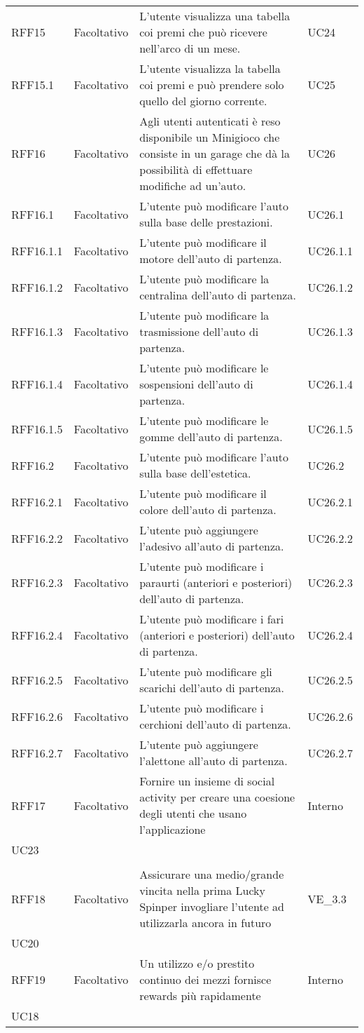 \begin{longtable}{ >{\centering}p{} >{\centering}p{}
		>{\raggedright}p{} >{\centering}p{}}
	\tabularnewline
	RFF15 & Facoltativo & L'utente visualizza una tabella coi premi che può ricevere nell'arco di un mese. & UC24 \tabularnewline
	RFF15.1 & Facoltativo & L'utente visualizza la tabella coi premi e può prendere solo quello del giorno corrente. & UC25
	\tabularnewline
	RFF16 & Facoltativo & Agli utenti autenticati è reso disponibile un Minigioco che consiste in un garage che dà la possibilità di effettuare modifiche ad un'auto. & UC26 
	\tabularnewline
	RFF16.1 & Facoltativo & L'utente può modificare l'auto sulla base delle prestazioni. & UC26.1
	\tabularnewline
	RFF16.1.1 & Facoltativo & L'utente può modificare il motore dell'auto di partenza. & UC26.1.1
	\tabularnewline
	RFF16.1.2 & Facoltativo & L'utente può modificare la centralina dell'auto di partenza. & UC26.1.2
	\tabularnewline
	RFF16.1.3 & Facoltativo & L'utente può modificare la trasmissione dell'auto di partenza. & UC26.1.3
	\tabularnewline
	RFF16.1.4 & Facoltativo & L'utente può modificare le sospensioni dell'auto di partenza. & UC26.1.4
	\tabularnewline
	RFF16.1.5 & Facoltativo & L'utente può modificare le gomme dell'auto di partenza. & UC26.1.5
	\tabularnewline
	RFF16.2 & Facoltativo & L'utente può modificare l'auto sulla base dell'estetica. & UC26.2
	\tabularnewline
	RFF16.2.1 & Facoltativo & L'utente può modificare il colore dell'auto di partenza. & UC26.2.1
	\tabularnewline
	RFF16.2.2 & Facoltativo & L'utente può aggiungere l'adesivo all'auto di partenza. & UC26.2.2
	\tabularnewline
	RFF16.2.3 & Facoltativo & L'utente può modificare i paraurti (anteriori e posteriori) dell'auto di partenza. & UC26.2.3
	\tabularnewline
	RFF16.2.4 & Facoltativo & L'utente può modificare i fari (anteriori e posteriori) dell'auto di partenza. & UC26.2.4
	\tabularnewline
	RFF16.2.5 & Facoltativo & L'utente può modificare gli scarichi dell'auto di partenza. & UC26.2.5
	\tabularnewline
	RFF16.2.6 & Facoltativo & L'utente può modificare i cerchioni dell'auto di partenza. & UC26.2.6
	\tabularnewline
	RFF16.2.7 & Facoltativo & L'utente può aggiungere l'alettone all'auto di partenza. & UC26.2.7
	\tabularnewline
	RFF17	&	Facoltativo	&	Fornire un insieme di social activity per creare una coesione degli utenti che usano l'applicazione &	Interno\\
	UC23\\ 	\tabularnewline
	RFF18	&	Facoltativo	& Assicurare una medio/grande vincita nella prima Lucky Spin\glosp per invogliare l'utente ad utilizzarla ancora in futuro &	VE\_3.3\\
	UC20   	\tabularnewline
	RFF19	&	Facoltativo	& Un utilizzo e/o prestito continuo dei mezzi fornisce rewards più rapidamente &	Interno\\UC18
\end{longtable}

